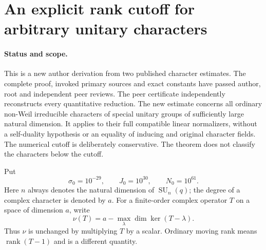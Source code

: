 \section{An explicit rank cutoff for arbitrary unitary characters}
\label{sec:unitary-nonweil-cutoff}

\paragraph{Status and scope.}
This is a new author derivation from two published character estimates.
The complete proof, invoked primary sources and exact constants have
passed author, root and independent peer reviews. The peer certificate
independently reconstructs every quantitative reduction.
The new estimate concerns all ordinary non-Weil irreducible characters
of special unitary groups of sufficiently large natural dimension.
It applies to their full compatible linear normalizers, without a
self-duality hypothesis or an equality of inducing and original
character fields.  The numerical cutoff is deliberately conservative.
The theorem does not classify the characters below the cutoff.

Put
\[
 \sigma_0=10^{-29},\qquad J_0=10^{30},\qquad N_0=10^{61}.
                                                               \tag{UNW.1}
\]
Here $n$ always denotes the natural dimension of
$\operatorname{SU}_n(q)$; the degree of a complex character is denoted
by $a$.  For a finite-order complex operator $T$ on a space of
dimension $a$, write
\[
 \nu(T)=a-\max_{\lambda}\dim\ker(T-\lambda).
                                                               \tag{UNW.2}
\]
Thus $\nu$ is unchanged by multiplying $T$ by a scalar.  Ordinary
moving rank means $\operatorname{rank}(T-1)$ and is a different
quantity.

